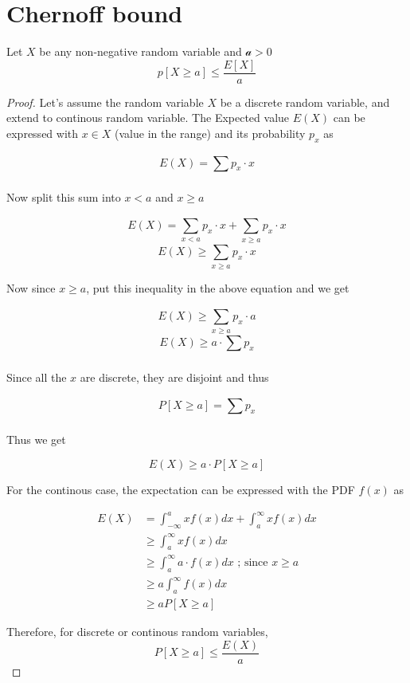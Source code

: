 \documentclass[openany]{book}
\begin{document}
	

	\chapter{Chernoff bound}
    \begin{lemma}
        Let $X$ be any non-negative random variable and $\mathcal{a} > 0$
        \[ p[X \geq a] \leq \frac{E[X]}{a} \] 
    \end{lemma}

    \begin{proof}
        Let's assume the random variable $X$ be a discrete random variable, and extend to 
        continous random variable. The Expected value $E(X)$ can be expressed with $x \in X$ 
        (value in the range) and its probability $p_x$ as 
        
        \[ E(X) = \sum_{}^{} p_x \cdot x \]
        
        Now split this sum into $x<a$ and $x \geq a$
        
        \[ E(X) = \sum_{x<a}^{} p_x \cdot x + \sum_{x \geq a}^{} p_x \cdot x \]
        \[ E(X) \geq \sum_{x \geq a}^{} p_x \cdot x \]
        
        Now since $x \geq a$, put this inequality in the above equation and we get 
        
        \[ E(X) \geq \sum_{x \geq a}^{} p_x \cdot a \]
        \[ E(X) \geq a \cdot \sum_{}^{} p_x \]
        
        Since all the $x$ are discrete, they are disjoint and thus 
        
        \[ P[X \geq a] = \sum_{}^{} p_x \] 
        
        Thus we get 
        
        \[ E(X) \geq a \cdot P[X \geq a] \] 
        
        For the continous case, the expectation can be expressed with the PDF $f(x)$ as 
        
        \begin{align*}
            E(X) &= \int_{-\infty}^{a} xf(x)dx +  \int_{a}^{\infty} xf(x)dx \\
            &\geq \int_{a}^{\infty} xf(x)dx \\
            &\geq \int_{a}^{\infty} a \cdot f(x)dx \text{ ; since } x \geq a \\
            &\geq a \int_{a}^{\infty} f(x)dx \\
            &\geq a P[X \geq a]
        \end{align*}    
        
        Therefore, for discrete or continous random variables, 
        \[ \boxed{P[X \geq a] \leq \frac{E(X)}{a}}\]
    \end{proof}
\end{document}
